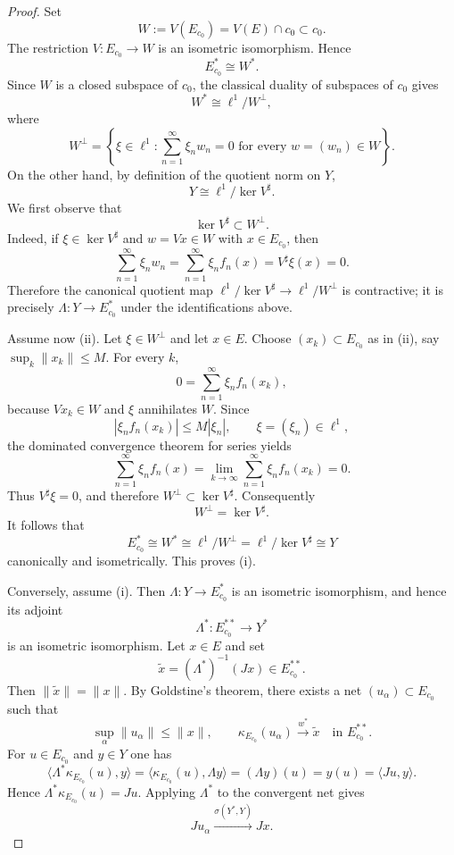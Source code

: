 \documentclass[11pt]{amsart}
\theoremstyle{plain}
\theoremstyle{definition}
\theoremstyle{remark}
\begin{document}
\begin{proof}
Set
\[
        W:=V(E_{c_0})=V(E)\cap c_0\subset c_0.
\]
The restriction $V:E_{c_0}\to W$ is an isometric isomorphism. Hence
\[
        E_{c_0}^*\cong W^*.
\]
Since $W$ is a closed subspace of $c_0$, the classical duality of subspaces
of $c_0$ gives
\[
        W^*\cong \ell^1/W^\perp,
\]
where
\[
        W^\perp=\left\{\xi\in\ell^1:
        \sum_{n=1}^\infty \xi_n w_n=0\text{ for every }w=(w_n)\in W
        \right\}.
\]
On the other hand, by definition of the quotient norm on $Y$,
\[
        Y\cong \ell^1/\ker V^\sharp.
\]
We first observe that
\[
        \ker V^\sharp\subset W^\perp.
\]
Indeed, if $\xi\in\ker V^\sharp$ and $w=Vx\in W$ with $x\in E_{c_0}$, then
\[
        \sum_{n=1}^\infty \xi_n w_n
        =\sum_{n=1}^\infty \xi_n f_n(x)
        =V^\sharp\xi(x)=0.
\]
Therefore the canonical quotient map
$\ell^1/\ker V^\sharp\to \ell^1/W^\perp$ is contractive; it is precisely
$\Lambda:Y\to E_{c_0}^*$ under the identifications above.

Assume now \textup{(ii)}. Let $\xi\in W^\perp$ and let $x\in E$. Choose
$(x_k)\subset E_{c_0}$ as in \textup{(ii)}, say $\sup_k\|x_k\|\le M$. For
every $k$,
\[
        0=\sum_{n=1}^\infty \xi_n f_n(x_k),
\]
because $Vx_k\in W$ and $\xi$ annihilates $W$. Since
\[
        |\xi_n f_n(x_k)|\le M|\xi_n|,
        \qquad \xi=(\xi_n)\in \ell^1,
\]
the dominated convergence theorem for series yields
\[
        \sum_{n=1}^\infty \xi_n f_n(x)
        =\lim_{k\to\infty}\sum_{n=1}^\infty \xi_n f_n(x_k)=0.
\]
Thus $V^\sharp\xi=0$, and therefore $W^\perp\subset \ker V^\sharp$.
Consequently
\[
        W^\perp=\ker V^\sharp.
\]
It follows that
\[
        E_{c_0}^*\cong W^*\cong \ell^1/W^\perp
        =\ell^1/\ker V^\sharp\cong Y
\]
canonically and isometrically. This proves \textup{(i)}.

Conversely, assume \textup{(i)}. Then
$\Lambda:Y\to E_{c_0}^*$ is an isometric isomorphism, and hence its adjoint
\[
        \Lambda^*:E_{c_0}^{**}\longrightarrow Y^*
\]
is an isometric isomorphism. Let $x\in E$ and set
\[
        \widetilde x=(\Lambda^*)^{-1}(Jx)\in E_{c_0}^{**}.
\]
Then $\|\widetilde x\|=\|x\|$. By Goldstine's theorem, there exists a net
$(u_\alpha)\subset E_{c_0}$ such that
\[
        \sup_\alpha\|u_\alpha\|\le \|x\|,
        \qquad
        \kappa_{E_{c_0}}(u_\alpha)\xrightarrow{w^*}\widetilde x
        \quad\text{in }E_{c_0}^{**}.
\]
For $u\in E_{c_0}$ and $y\in Y$ one has
\[
        \langle \Lambda^*\kappa_{E_{c_0}}(u),y\rangle
        =\langle \kappa_{E_{c_0}}(u),\Lambda y\rangle
        =(\Lambda y)(u)=y(u)=\langle Ju,y\rangle.
\]
Hence $\Lambda^*\kappa_{E_{c_0}}(u)=Ju$. Applying $\Lambda^*$ to the
convergent net gives
\[
        Ju_\alpha\xrightarrow{\sigma(Y^*,Y)}Jx.
\]


\end{proof}
\end{document}
